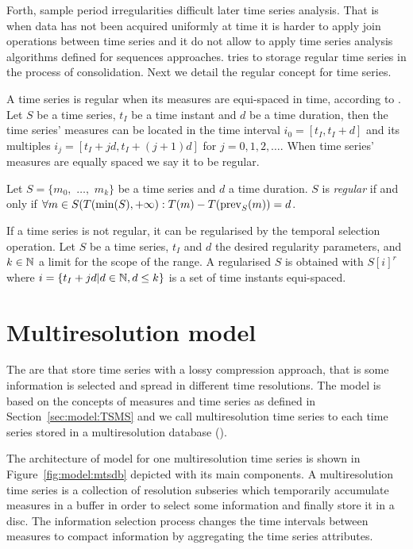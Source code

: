Forth, sample period irregularities difficult later time series
analysis. That is when data has not been acquired uniformly at time it
is harder to apply join operations between time series and it do not
allow to apply time series analysis algorithms defined for sequences
approaches.   tries to storage regular time series in the
process of consolidation.  Next we detail the regular concept for time
series.


A time series is regular when its measures are equi-spaced in time,
according to \cite{last:hetland}. Let $S$ be a time series, $t_I$
be a time instant and $d$ be a time duration, then the time
series' measures can be located in the time interval $i_0=[t_I,
t_I+d]$ and its multiples $i_j=[t_I+jd, t_I+(j+1)d]$
for $j=0,1,2,\ldots$. When time series' measures are equally spaced we
say it to be regular.

\begin{definition}
  Let $S=\{m_0,$ $\ldots,$ $m_k\}$ be a time series and $d$ a time
  duration. $S$ is \emph{regular} if and only if $\forall m \in
  S(T(\min(S),+\infty):T(m) - T(\operatorname*{prev}_S(m)) = d$.
\end{definition}


If a time series is not regular, it can be regularised by the temporal
selection operation. Let $S$ be a time series, $t_I$ and $d$ the
desired regularity parameters, and $k\in\mathbb{N}$ a limit for the scope of
the range.  A regularised $S$ is obtained with $S[i]^r$ where $i =
\{t_I+jd | d\in\mathbb{N}, d\leq k \}$ is a set of time instants equi-spaced.





\section{Multiresolution model}
\label{sec:MTSMS}


The  are  that store time series with a lossy
compression approach, that is some information is selected and spread
in different time resolutions. The  model is based on the
concepts of measures and time series as defined in
Section~\ref{sec:model:TSMS} and we call multiresolution time series
to each time series stored in a multiresolution database
().


The architecture of  model for one multiresolution time series is
shown in Figure~\ref{fig:model:mtsdb} depicted with its main
components.  A multiresolution time series is a collection of
resolution subseries which temporarily accumulate measures in a buffer
in order to select some information and finally store it in a
disc. The information selection process changes the time intervals
between measures to compact information by aggregating the time series
attributes.

